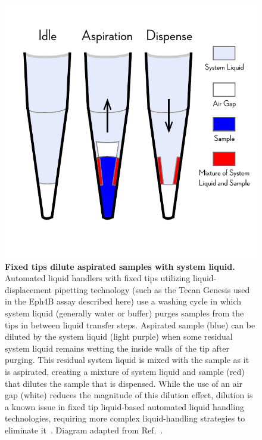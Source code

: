 \documentclass[aps,pre,twocolumn,nofootinbib,superscriptaddress,linenumbers]{revtex4-1}
\begin{document}
\begin{figure}[tb]
    \includegraphics[width=\columnwidth]{../figures/dilution_effect.pdf}

  \caption{{\bf Fixed tips dilute aspirated samples with system liquid.}
  Automated liquid handlers with fixed tips utilizing liquid-displacement pipetting technology (such as the Tecan Genesis used in the Eph4B assay described here) use a washing cycle in which system liquid (generally water or buffer) purges samples from the tips in between liquid transfer steps.
  Aspirated sample (blue) can be diluted by the system liquid (light purple) when some residual system liquid remains wetting the inside walls of the tip after purging.
  This residual system liquid is mixed with the sample as it is aspirated, creating a mixture of system liquid and sample (red) that dilutes the sample that is dispensed. 
  While the use of an air gap (white) reduces the magnitude of this dilution effect, dilution is a known issue in fixed tip liquid-based automated liquid handling technologies, requiring more complex liquid-handling strategies to eliminate it~\cite{gu_dilution_2007}. 
  Diagram adapted from Ref.~\cite{gu_dilution_2007}. 
  }
  \label{fig:dilution_effect}
\end{figure}
\end{document}
